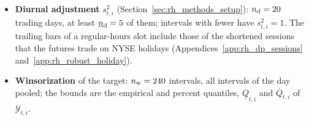 \begin{itemize}
\item \textbf{Diurnal adjustment} $s^2_{t,i}$ (Section~\ref{sec:rh_methods_setup}): $n_{\mathrm{d}} =
  20$ trading days, at least $\underline n_{\mathrm{d}} = 5$ of them; intervals with
  fewer have $s^2_{t,i} = 1$. The trailing bars of a regular-hours slot include those of the shortened sessions
  that the futures trade on NYSE holidays (Appendices~\ref{app:rh_dp_sessions} and~\ref{app:rh_robust_holiday}).
\item \textbf{Winsorization} of the target: $n_{\mathrm{w}} = 240$ intervals, all intervals of the day
  pooled; the bounds are the empirical \rhdmWinsorLoPct{} and \rhdmWinsorHiPct{} percent quantiles,
  $\underline Q_{t,i}$ and $\overline Q_{t,i}$ of $\mathcal Y_{t,i}$.

\end{itemize}
